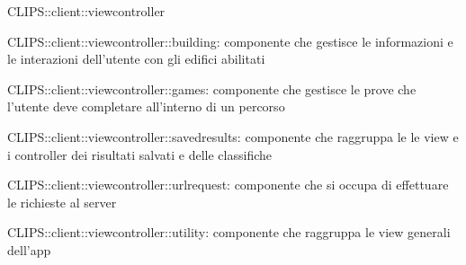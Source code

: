 \begin{componente}{CLIPS::client::viewcontroller}
\begin{compPackageContenuti}
\item CLIPS::client::viewcontroller::building: componente che gestisce le informazioni e le interazioni dell'utente con gli edifici abilitati
\item CLIPS::client::viewcontroller::games: componente che gestisce le prove che l'utente deve completare all'interno di un percorso
\item CLIPS::client::viewcontroller::savedresults: componente che raggruppa le le view e i controller dei risultati salvati e delle classifiche
\item CLIPS::client::viewcontroller::urlrequest: componente che si occupa di effettuare le richieste al server
\item CLIPS::client::viewcontroller::utility: componente che raggruppa le view generali dell'app
\end{compPackageContenuti}
\end{componente}
